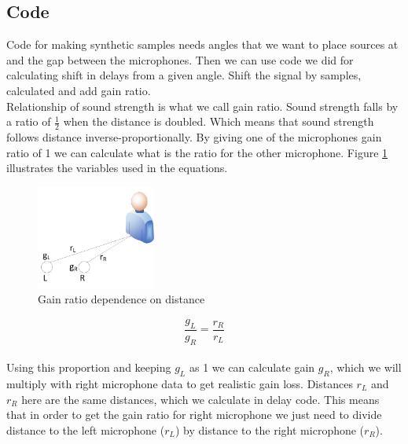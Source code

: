   \subsection{Code}
  Code for making synthetic samples needs angles that we want to place sources at and the gap between the 
microphones. Then we can use code we did for calculating shift in delays from a given angle. Shift the signal 
by samples, calculated and add gain ratio. \\
  Relationship of sound strength is what we call gain ratio. Sound strength falls by a ratio of \( \frac{1}{2}
\) when the distance is doubled. Which means that sound strength follows distance inverse-proportionally. 
  By giving one of the microphones gain ratio of 1 we can calculate what is the ratio for the other 
microphone. Figure \ref{fig:ratioDependence} illustrates the variables used in the equations.
\begin{figure}[htp]
	\centering
	\includegraphics[width=0.35\textwidth]{Illustrations/gainRatio.jpg}
	\caption{Gain ratio dependence on distance}
	\label{fig:ratioDependence}
\end{figure}
 \[\frac{g_L}{g_R} = \frac{r_R}{r_L} \]\\
Using this proportion and keeping \(g_L\) as 1 we can calculate gain \(g_R\), which we will multiply with 
right microphone data to get realistic gain loss. Distances \(r_L\) and \(r_R\) here are the same distances, 
which we calculate in delay code. This means that in order to get the gain ratio for right microphone we just 
need to divide distance to the left microphone (\(r_L\)) by distance to the right microphone (\(r_R\)).
